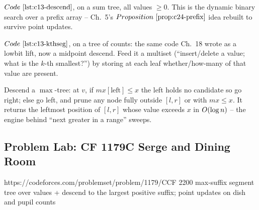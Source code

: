  \(\coderef{c13-descend}\), on a sum tree, all
values \(\ge0\).  This is the dynamic binary search over a prefix array -- Ch.~5's
\(\propref{c24-prefix}\) idea rebuilt to survive point updates.

 \(\coderef{c13-kthseg}\), on a tree of counts: the same
code Ch.~18 wrote as a lowbit lift, now a midpoint descend.  Feed it a multiset
(``insert/delete a value; what is the \(k\)-th smallest?'') by storing at each leaf
whether/how-many of that value are present.

 Descend a \(\max\)-tree: at \(v\), if
\(\mathit{mx}[\text{left}]\le x\) the left holds no candidate so go right; else go
left, and prune any node fully outside \([l,r]\) or with \(\mathit{mx}\le x\).  It
returns the leftmost position of \([l,r]\) whose value exceeds \(x\) in
\(O(\log n)\) -- the engine behind ``next greater in a range'' sweeps.

\subsection{Problem Lab: CF 1179C Serge and Dining Room}

  {https://codeforces.com/problemset/problem/1179/C}{CF 2200}
  {max-suffix segment tree over values + descend to the largest positive suffix; point updates on dish and pupil counts}

